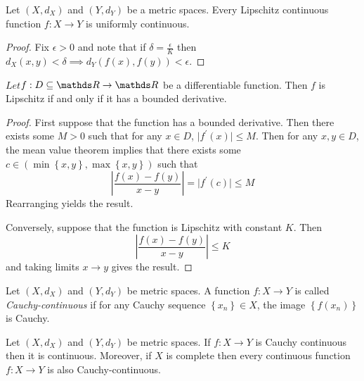 \begin{prop}
\label{prop:lipschitzContinuous}Let $\left(X,d_{X}\right)$ and $\left(Y,d_{Y}\right)$
be a metric spaces. Every Lipschitz continuous function $f:X\to Y$
is uniformly continuous.
\end{prop}

\begin{proof}
Fix $\epsilon>0$ and note that if $\delta=\frac{\epsilon}{K}$ then
$d_{X}\left(x,y\right)<\delta\implies d_{Y}\left(f\left(x\right),f\left(y\right)\right)<\epsilon.$
\end{proof}
\begin{prop}
\label{prop:lipschitzBoundedDerivative}$Let$$f:D\subseteq\R\to\R$
be a differentiable function. Then $f$ is Lipschitz if and only if
it has a bounded derivative.
\end{prop}

\begin{proof}
First suppose that the function has a bounded derivative. Then there
exists some $M>0$ such that for any $x\in D$, $\lvert f^{\prime}\left(x\right)\rvert\leq M.$
Then for any $x,y\in D$, the mean value theorem implies that there
exists some $c\in\left(\min\left\{ x,y\right\} ,\max\left\{ x,y\right\} \right)$
such that 
\[
\left\lvert \frac{f\left(x\right)-f\left(y\right)}{x-y}\right\rvert =\lvert f^{\prime}\left(c\right)\rvert\leq M
\]
Rearranging yields the result.

Conversely, suppose that the function is Lipschitz with constant $K$.
Then
\[
\left\lvert \frac{f\left(x\right)-f\left(y\right)}{x-y}\right\rvert \leq K
\]
and taking limits $x\to y$ gives the result.
\end{proof}
\begin{defn}
\label{def:cauchyContinuity}Let $\left(X,d_{X}\right)$ and $\left(Y,d_{Y}\right)$
be metric spaces. A function $f:X\to Y$ is called \emph{Cauchy-continuous
}if for any Cauchy sequence $\left\{ x_{n}\right\} \in X$, the image
$\left\{ f\left(x_{n}\right)\right\} $ is Cauchy.
\end{defn}

\begin{prop}
\label{prop:CauchyContinuityImpliesContinuity}Let $\left(X,d_{X}\right)$
and $\left(Y,d_{Y}\right)$ be metric spaces. If $f:X\to Y$ is Cauchy
continuous then it is continuous. Moreover, if $X$ is complete then
every continuous function $f:X\to Y$ is also Cauchy-continuous.
\end{prop}


